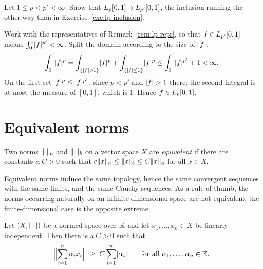 \begin{exercise}\label{exc:Lp-inclusion}
Let $1 \le p < p' < \infty$. Show that
$L_{p}[0,1] \supset L_{p'}[0,1]$, the inclusion running the other way than
in Exercise~\ref{exc:lp-inclusion}.
\end{exercise}

\begin{solution}
Work with the representatives of Remark~\ref{rem:lp-repr}, so that
$f \in L_{p'}[0,1]$ means $\int_0^1 \lvert f\rvert^{p'} < \infty$. Split the domain
according to the size of $\lvert f\rvert$:
\[
  \int_0^1 \lvert f\rvert^p
  = \int_{\{\lvert f\rvert > 1\}} \lvert f\rvert^p
    + \int_{\{\lvert f\rvert \le 1\}} \lvert f\rvert^p
  \le \int_0^1 \lvert f\rvert^{p'} + 1 < \infty .
\]
On the first set $\lvert f\rvert^p \le \lvert f\rvert^{p'}$, since $p < p'$ and
$\lvert f\rvert > 1$ there; the second integral is at most the measure of $[0,1]$,
which is $1$. Hence $f \in L_{p}[0,1]$.
\end{solution}

\section{Equivalent norms}

\begin{definition}\label{def:equiv}
Two norms $\lVert\cdot\rVert_a$ and $\lVert\cdot\rVert_b$ on a vector space $X$ are
\emph{equivalent} if there are constants $c, C > 0$ such that
$c\lVert x\rVert_a \le \lVert x\rVert_b \le C\lVert x\rVert_a$ for all $x \in X$.
\end{definition}

Equivalent norms induce the same topology, hence the same convergent
sequences with the same limits, and the same Cauchy sequences. As a rule of
thumb, the norms occurring naturally on an infinite-dimensional space are not
equivalent; the finite-dimensional case is the opposite extreme.

\begin{lemma}\label{lem:independent}
Let $(X, \lVert\cdot\rVert)$ be a normed space over $\mathbb{K}$ and let
$x_1, \dots, x_n \in X$ be linearly independent. Then there is a $C > 0$ such
that
\[
  \Bigl\lVert \sum_{i=1}^{n} \alpha_i x_i \Bigr\rVert
  \;\ge\; C \sum_{i=1}^{n} \lvert\alpha_i\rvert
  \qquad \text{for all } \alpha_1, \dots, \alpha_n \in \mathbb{K} .
\]
\end{lemma}


